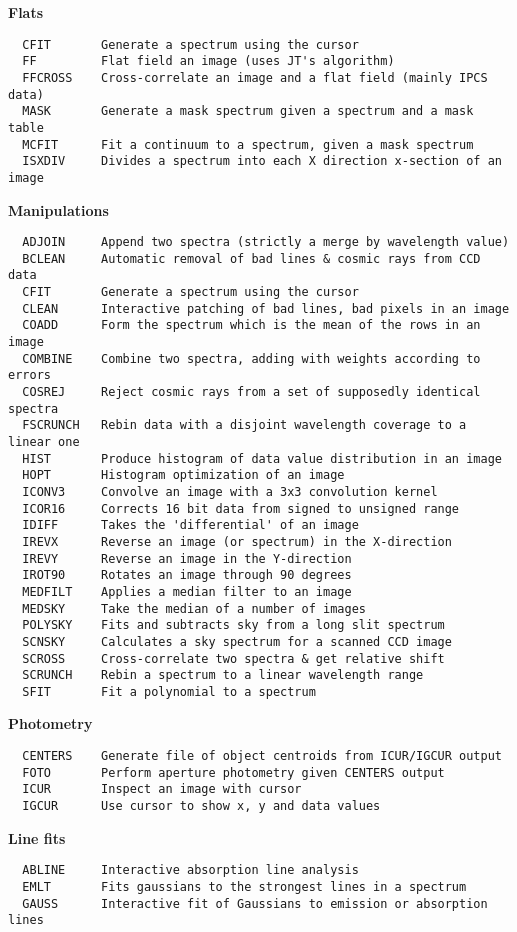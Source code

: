\goodbreak
{\bf Flats}
\begin{verbatim}
  CFIT       Generate a spectrum using the cursor
  FF         Flat field an image (uses JT's algorithm)
  FFCROSS    Cross-correlate an image and a flat field (mainly IPCS data)
  MASK       Generate a mask spectrum given a spectrum and a mask table
  MCFIT      Fit a continuum to a spectrum, given a mask spectrum
  ISXDIV     Divides a spectrum into each X direction x-section of an image
\end{verbatim}
\goodbreak
{\bf Manipulations}
\begin{verbatim}
  ADJOIN     Append two spectra (strictly a merge by wavelength value)
  BCLEAN     Automatic removal of bad lines & cosmic rays from CCD data
  CFIT       Generate a spectrum using the cursor
  CLEAN      Interactive patching of bad lines, bad pixels in an image
  COADD      Form the spectrum which is the mean of the rows in an image
  COMBINE    Combine two spectra, adding with weights according to errors
  COSREJ     Reject cosmic rays from a set of supposedly identical spectra
  FSCRUNCH   Rebin data with a disjoint wavelength coverage to a linear one
  HIST       Produce histogram of data value distribution in an image
  HOPT       Histogram optimization of an image
  ICONV3     Convolve an image with a 3x3 convolution kernel
  ICOR16     Corrects 16 bit data from signed to unsigned range
  IDIFF      Takes the 'differential' of an image
  IREVX      Reverse an image (or spectrum) in the X-direction
  IREVY      Reverse an image in the Y-direction
  IROT90     Rotates an image through 90 degrees
  MEDFILT    Applies a median filter to an image
  MEDSKY     Take the median of a number of images
  POLYSKY    Fits and subtracts sky from a long slit spectrum
  SCNSKY     Calculates a sky spectrum for a scanned CCD image
  SCROSS     Cross-correlate two spectra & get relative shift
  SCRUNCH    Rebin a spectrum to a linear wavelength range
  SFIT       Fit a polynomial to a spectrum
\end{verbatim}
\goodbreak
{\bf Photometry}
\begin{verbatim}
  CENTERS    Generate file of object centroids from ICUR/IGCUR output
  FOTO       Perform aperture photometry given CENTERS output
  ICUR       Inspect an image with cursor
  IGCUR      Use cursor to show x, y and data values
\end{verbatim}
\goodbreak
{\bf Line fits}
\begin{verbatim}
  ABLINE     Interactive absorption line analysis
  EMLT       Fits gaussians to the strongest lines in a spectrum
  GAUSS      Interactive fit of Gaussians to emission or absorption lines
\end{verbatim}
